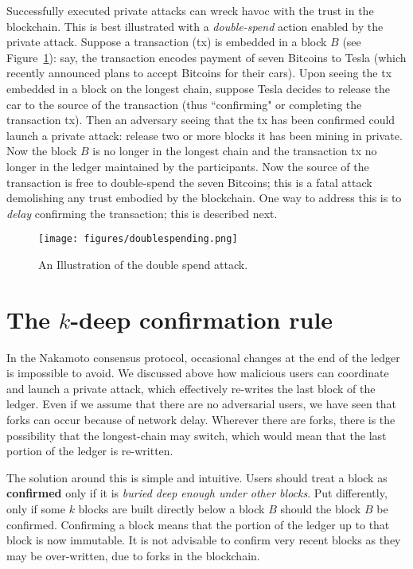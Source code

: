 \documentclass{article}
\begin{document}
Successfully executed private attacks can wreck havoc with the trust in the blockchain. This is best illustrated with a {\em double-spend} action enabled by the private attack. Suppose a transaction ({\sf tx}) is embedded in a block $B$ (see Figure~\ref{fig:doublespend}): say, the transaction encodes payment of seven Bitcoins to {\sf Tesla} (which recently announced plans to accept Bitcoins for their cars).  Upon seeing the {\sf tx} embedded in a block on the longest chain, suppose {\sf Tesla} decides to release the car to the source of the transaction (thus ``confirming" or completing the transaction {\sf tx}). Then an adversary seeing that the  {\sf tx} has been confirmed could launch a private attack: release two or more blocks it has been mining in private. Now the block $B$ is no longer in the longest chain and the transaction {\sf tx} no longer in the ledger maintained by the participants. Now the source of the transaction is free to double-spend the seven Bitcoins; this is a fatal attack  demolishing any trust embodied by the blockchain. One way to address this is to {\em delay} confirming the transaction; this is described next. 

\begin{figure}[htbp]
    \centering
    \texttt{[image: figures/doublespending.png]}
    \caption{An Illustration of the double spend attack.}
    \label{fig:doublespend}
\end{figure}


\section*{The $k$-deep confirmation rule}
In the Nakamoto consensus protocol, occasional changes at the end of the ledger is impossible to avoid. We discussed above how malicious users can coordinate and launch a private attack, which effectively re-writes the last  block of the ledger. Even if we assume that there are no adversarial users, we have seen that forks can occur because of network delay. Wherever there are forks, there is the possibility that the longest-chain may switch, which would mean that the last portion of the ledger is re-written. 

The solution around this is simple and intuitive. Users should treat a block as \textbf{confirmed} only if it is {\em buried deep enough under other blocks}. Put differently, only if some $k$ blocks are built directly below a block $B$ should the block $B$ be confirmed. Confirming a block means that the portion of the ledger up to that block is now immutable. It is not advisable to confirm very recent blocks as they may be over-written, due to forks in the blockchain. 
\end{document}

